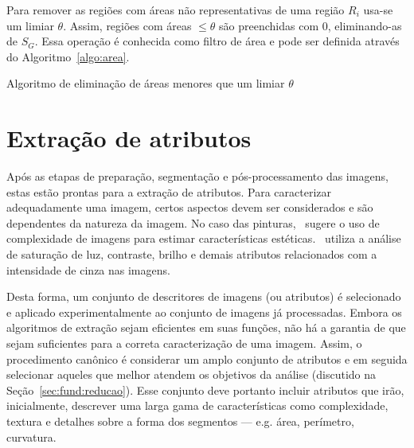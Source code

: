Para remover as regiões com áreas não representativas de uma região
$R_i$ usa-se um limiar $\theta$. Assim, regiões com áreas $\leq
\theta$ são preenchidas com $0$, eliminando-as de $S_G$. Essa operação
é conhecida como filtro de área e pode ser definida através do
Algoritmo~\ref{algo:area}.

\begin{espacosimples}
\begin{algorithm2e}[H]
  \caption{Algoritmo de eliminação de áreas menores que um limiar $\theta$}
  \label{algo:area}
  \SetAlgoLined

\end{algorithm2e}
\end{espacosimples}
             
\section{Extração de atributos}
\label{sec:atributos}

Após as etapas de preparação, segmentação e pós-processamento das
imagens, estas estão prontas para a extração de atributos. Para
caracterizar adequadamente uma imagem, certos aspectos devem ser
considerados e são dependentes da natureza da imagem. No caso das
pinturas,~\citeauthor{penousal} sugere o uso de complexidade de
imagens para estimar características
estéticas.~\citeauthor{manovich,manovich2,manovich3} utiliza a análise
de saturação de luz, contraste, brilho e demais atributos relacionados
com a intensidade de cinza nas imagens.


Desta forma, um conjunto de descritores de imagens (ou atributos) é
selecionado e aplicado experimentalmente ao conjunto de imagens já
processadas. Embora os algoritmos de extração sejam eficientes em suas
funções, não há a garantia de que sejam suficientes para a correta
caracterização de uma imagem. Assim, o procedimento canônico é
considerar um amplo conjunto de atributos e em seguida selecionar
aqueles que melhor atendem os objetivos da análise (discutido na
Seção~\ref{sec:fund:reducao}). Esse conjunto deve portanto incluir
atributos que irão, inicialmente, descrever uma larga gama de
características como complexidade, textura e detalhes sobre a forma
dos segmentos --- e.g. área, perímetro, curvatura.

